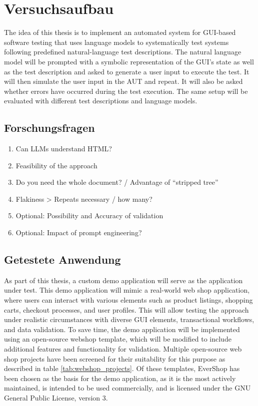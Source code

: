 \chapter{Versuchsaufbau}
\label{ch:ExperimentalSetup}

The idea of this thesis is to implement an automated system for GUI-based software testing that uses language models to systematically test systems following predefined natural-language test descriptions.
The natural language model will be prompted with a symbolic representation of the GUI’s state as well as the test description and asked to generate a user input to execute the test.
It will then simulate the user input in the AUT and repeat.
It will also be asked whether errors have occurred during the test execution.
The same setup will be evaluated with different test descriptions and language models.

\section{Forschungsfragen}

\begin{enumerate}
    \item Can LLMs understand HTML?
    \item Feasibility of the approach
    \item Do you need the whole document? / Advantage of “stripped tree”
    \item Flakiness > Repeats necessary / how many?
    \item Optional: Possibility and Accuracy of validation
    \item Optional: Impact of prompt engineering?
\end{enumerate}

\section{Getestete Anwendung}

As part of this thesis, a custom demo application will serve as the application under test.
This demo application will mimic a real-world web shop application, where users can interact with various elements such as product listings, shopping carts, checkout processes, and user profiles.
This will allow testing the approach under realistic circumstances with diverse GUI elements, transactional workflows, and data validation.
To save time, the demo application will be implemented using an open-source webshop template, which will be modified to include additional features and functionality for validation.
Multiple open-source web shop projects have been screened for their suitability for this purpose as described in table \ref{tab:webshop_projects}.
Of these templates, EverShop has been chosen as the basis for the demo application, as it is the most actively maintained, is intended to be used commercially, and is licensed under the GNU General Public License, version 3.

